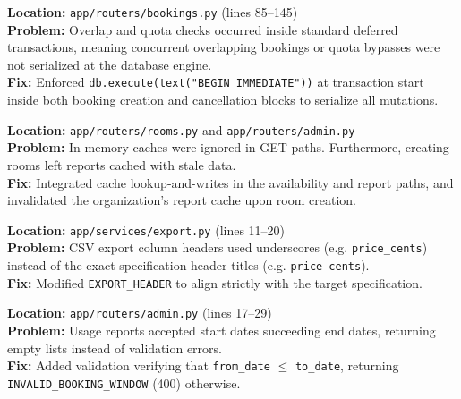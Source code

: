 \documentclass[11pt,a4paper]{article}
\begin{document}
\begin{tcolorbox}[colback=red!5!white,colframe=red!75!black,title=Bug 05: Concurrency Race Conditions (TOCTOU) in Booking Creation/Cancellation]
\textbf{Location:} \texttt{app/routers/bookings.py} (lines 85--145)\\
\textbf{Problem:} Overlap and quota checks occurred inside standard deferred transactions, meaning concurrent overlapping bookings or quota bypasses were not serialized at the database engine.\\
\textbf{Fix:} Enforced \texttt{db.execute(text("BEGIN IMMEDIATE"))} at transaction start inside both booking creation and cancellation blocks to serialize all mutations.
\end{tcolorbox}

\begin{tcolorbox}[colback=yellow!5!white,colframe=yellow!75!black,title=Bug 06: Incomplete and Stale Caching Integration]
\textbf{Location:} \texttt{app/routers/rooms.py} and \texttt{app/routers/admin.py}\\
\textbf{Problem:} In-memory caches were ignored in GET paths. Furthermore, creating rooms left reports cached with stale data.\\
\textbf{Fix:} Integrated cache lookup-and-writes in the availability and report paths, and invalidated the organization's report cache upon room creation.
\end{tcolorbox}

\begin{tcolorbox}[colback=red!5!white,colframe=red!75!black,title=Bug 07: Export CSV Header Spacing Deviations]
\textbf{Location:} \texttt{app/services/export.py} (lines 11--20)\\
\textbf{Problem:} CSV export column headers used underscores (e.g. \texttt{price\_cents}) instead of the exact specification header titles (e.g. \texttt{price cents}).\\
\textbf{Fix:} Modified \texttt{EXPORT\_HEADER} to align strictly with the target specification.
\end{tcolorbox}

\begin{tcolorbox}[colback=yellow!5!white,colframe=yellow!75!black,title=Bug 08: Missing Date Range Validation in Usage Report]
\textbf{Location:} \texttt{app/routers/admin.py} (lines 17--29)\\
\textbf{Problem:} Usage reports accepted start dates succeeding end dates, returning empty lists instead of validation errors.\\
\textbf{Fix:} Added validation verifying that \texttt{from\_date} $\le$ \texttt{to\_date}, returning \texttt{INVALID\_BOOKING\_WINDOW} (400) otherwise.
\end{tcolorbox}
\end{document}
